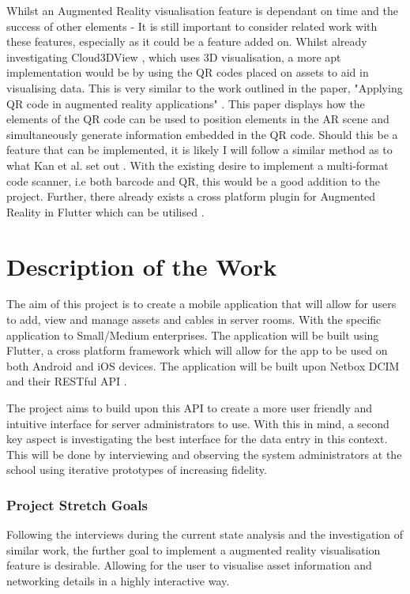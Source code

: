 \documentclass [11pt,a4paper]{article}
\begin{document}
Whilst an Augmented Reality visualisation feature is dependant on time and the success of other elements - It is still important to consider related work with these features, especially as it could be a feature added on. Whilst already investigating Cloud3DView \cite{cloud3dview}, which uses 3D visualisation, a more apt implementation would be by using the QR codes placed on assets to aid in visualising data. This is very similar to the work outlined in the paper, "Applying QR code in augmented reality applications" \cite{applyingQR}. This paper displays how the elements of the QR code can be used to position elements in the AR scene and simultaneously generate information embedded in the QR code. Should this be a feature that can be implemented, it is likely I will follow a similar method as to what Kan et al. set out \cite{applyingQR}. With the existing desire to implement a multi-format code scanner, i.e both barcode and QR, this would be a good addition to the project. Further, there already exists a cross platform plugin for Augmented Reality in Flutter which can be utilised \cite{ar_flutter}.

\section{Description of the Work}
\label{sec:work}
The aim of this project is to create a mobile application that will allow for users to add, view and manage assets and cables in server rooms. With the specific application to Small/Medium enterprises. The application will be built using Flutter, a cross platform framework which will allow for the app to be used on both Android and iOS devices. The application will be built upon Netbox DCIM \cite{Netbox} and their RESTful API \cite{NetboxAPI}. 

The project aims to build upon this API to create a more user friendly and intuitive interface for server administrators to use. With this in mind, a second key aspect is investigating the best interface for the data entry in this context. This will be done by interviewing and observing the system administrators at the school using iterative prototypes of increasing fidelity.

\subsubsection{Project Stretch Goals}
\label{sec:stretchgoals}
Following the interviews during the current state analysis and the investigation of similar work, the further goal to implement a augmented reality visualisation feature is desirable. Allowing for the user to visualise asset information and networking details in a highly interactive way. 
\end{document}
